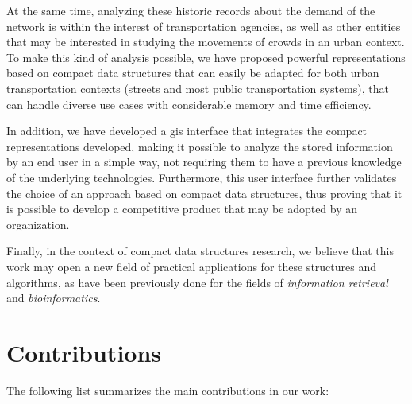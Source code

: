 \documentclass[a4paper,10pt,twoside]{book}
\begin{document}
	At the same time, analyzing these historic records about the demand of the network is within the interest of transportation agencies, as well as other entities that may be interested in studying the movements of crowds in an urban context. To make this kind of analysis possible, we have proposed powerful representations based on compact data structures that can easily be adapted for both urban transportation contexts (streets and most public transportation systems), that can handle diverse use cases with considerable memory and time efficiency.
	
	In addition, we have developed a \gls{gis} interface that integrates the compact representations developed, making it possible to analyze the stored information by an end user in a simple way, not requiring them to have a previous knowledge of the underlying technologies. Furthermore, this user interface further validates the choice of an approach based on compact data structures, thus proving that it is possible to develop a competitive product that may be adopted by an organization.
	
	Finally, in the context of compact data structures research, we believe that this work may open a new field of practical applications for these structures and algorithms, as have been previously done for the fields of \textit{information retrieval} and \textit{bioinformatics}.
	
	\section{Contributions}
	The following list summarizes the main contributions in our work:
	
\end{document}
